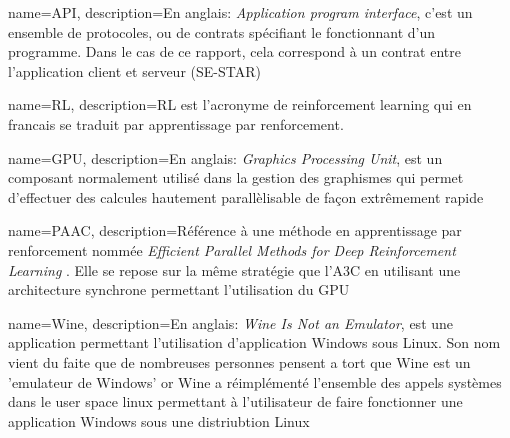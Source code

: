 
{
    name=API,
    description={En anglais: \emph{Application program interface}, c'est un ensemble de protocoles, ou de contrats spécifiant le fonctionnant d'un programme. Dans le cas de ce rapport, cela correspond à un contrat entre l'application client et serveur (SE-STAR)}
}

{
    name=RL,
    description={RL est l'acronyme de reinforcement learning qui en francais se traduit par apprentissage par renforcement.}
}


{
    name=GPU,
    description={En anglais: \emph{Graphics Processing Unit}, est un composant normalement utilisé dans la gestion des graphismes qui permet d'effectuer des calcules hautement parallèlisable de façon extrêmement rapide}
}

{
    name=PAAC,
    description={Référence à une méthode en apprentissage par renforcement nommée \emph{Efficient Parallel Methods for Deep Reinforcement Learning }\cite{2017arXiv170504862C}. Elle se repose sur la même stratégie que l'A3C en utilisant une architecture synchrone permettant l'utilisation du GPU} 
}

{
    name=Wine,
    description={En anglais: \emph{Wine Is Not an Emulator}, est une application permettant l'utilisation d'application Windows sous Linux. Son nom vient du faite que de nombreuses personnes pensent a tort que Wine est un 'emulateur de Windows' or Wine a réimplémenté l'ensemble des appels systèmes dans le user space linux permettant à l'utilisateur de faire fonctionner une application Windows sous une distriubtion Linux}
}




